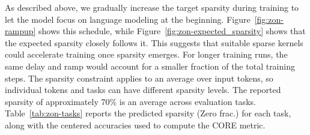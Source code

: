 As described above, we gradually increase the target sparsity during training
to let the model focus on language modeling at the beginning.
Figure~\ref{fig:zon-rampup} shows this schedule, while
Figure~\ref{fig:zon-expected_sparsity} shows that the expected sparsity closely
follows it. This suggests that suitable sparse kernels could accelerate
training once sparsity emerges. For longer training runs, the same delay and
ramp would account for a smaller fraction of the total training steps.
The sparsity constraint applies to an average over input tokens, so individual
tokens and tasks can have different sparsity levels.
The reported sparsity of approximately 70\% is an average across evaluation tasks.
Table~\ref{tab:zon-tasks} reports the predicted sparsity (Zero frac.) for each
task, along with the centered accuracies used to compute the CORE metric.
\begin{table}[!htbp]
\caption{Evaluation of Dense-1.2B (Dense) and ZoN-1.2B-A600M (Sparse). All entries are percentages;
CORE is the mean centered score. $\%0$ measures the fraction of zeros predicted by ZoN
MLP gates during inference. BB denotes BIG-bench.}
\label{tab:zon-tasks}
\begin{center}
\small
\setlength{\tabcolsep}{4pt}
\end{center}
\end{table}
